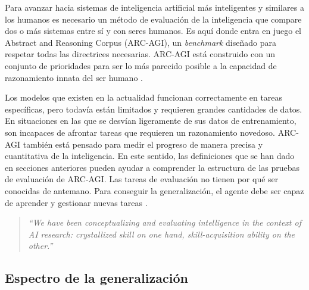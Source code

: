 \documentclass[11pt,a4paper,spanish]{book}
\numberwithin{equation}{chapter}
\numberwithin{figure}{chapter}
\begin{document}
\begin{center}
\cite{hernandez2017evaluation}
\end{center}

Para avanzar hacia sistemas de inteligencia artificial más inteligentes y similares a los humanos es necesario un método de evaluación de la inteligencia que compare dos o más sistemas entre sí y con seres humanos. Es aquí donde entra en juego
el Abstract and Reasoning Corpus (ARC-AGI), un \textit{benchmark} diseñado para respetar todas las directrices necesarias. ARC-AGI está construido con un conjunto de prioridades para ser lo más parecido posible
a la capacidad de razonamiento innata del ser humano \cite{chollet2019measure}.

Los modelos que existen en la actualidad funcionan correctamente en tareas específicas, pero todavía están limitados y requieren grandes cantidades de datos. En situaciones en las que se desvían ligeramente de sus datos de entrenamiento,
son incapaces de afrontar tareas que requieren un razonamiento novedoso. ARC-AGI también está pensado para medir el progreso de manera precisa y cuantitativa de la inteligencia. En este sentido, las definiciones
que se han dado en secciones anteriores pueden ayudar a comprender la estructura de las pruebas de evaluación de ARC-AGI. Las tareas de evaluación no tienen por qué ser conocidas de
antemano. Para conseguir la generalización, el agente debe ser capaz de aprender y gestionar nuevas tareas \cite{chollet2019measure}.

\begin{quote}
\itshape
``We have been conceptualizing and evaluating intelligence in the context of AI research: crystallized skill on one hand, skill-acquisition ability on the other.''
\end{quote}

\begin{center}
\cite{chollet2019measure}
\end{center}

\subsection{Espectro de la generalización}
\end{document}
